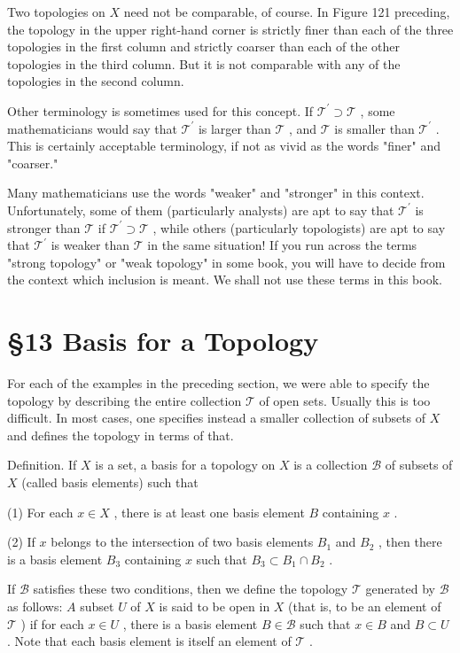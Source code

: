 Two topologies on \(X\) need not be comparable, of course. In Figure 121 preceding, the topology in the upper right-hand corner is strictly finer than each of the three topologies in the first column and strictly coarser than each of the other topologies in the third column. But it is not comparable with any of the topologies in the second column.

Other terminology is sometimes used for this concept. If \({\mathcal{T}}^{\prime } \supset  \mathcal{T}\) , some mathematicians would say that \({\mathcal{T}}^{\prime }\) is larger than \(\mathcal{T}\) , and \(\mathcal{T}\) is smaller than \({\mathcal{T}}^{\prime }\) . This is certainly acceptable terminology, if not as vivid as the words "finer" and "coarser."

Many mathematicians use the words "weaker" and "stronger" in this context. Unfortunately, some of them (particularly analysts) are apt to say that \({\mathcal{T}}^{\prime }\) is stronger than \(\mathcal{T}\) if \({\mathcal{T}}^{\prime } \supset  \mathcal{T}\) , while others (particularly topologists) are apt to say that \({\mathcal{T}}^{\prime }\) is weaker than \(\mathcal{T}\) in the same situation! If you run across the terms "strong topology" or "weak topology" in some book, you will have to decide from the context which inclusion is meant. We shall not use these terms in this book.

\section*{§13 Basis for a Topology}

For each of the examples in the preceding section, we were able to specify the topology by describing the entire collection \(\mathcal{T}\) of open sets. Usually this is too difficult. In most cases, one specifies instead a smaller collection of subsets of \(X\) and defines the topology in terms of that.

Definition. If \(X\) is a set, a basis for a topology on \(X\) is a collection \(\mathcal{B}\) of subsets of \(X\) (called basis elements) such that

(1) For each \(x \in  X\) , there is at least one basis element \(B\) containing \(x\) .

(2) If \(x\) belongs to the intersection of two basis elements \({B}_{1}\) and \({B}_{2}\) , then there is a basis element \({B}_{3}\) containing \(x\) such that \({B}_{3} \subset  {B}_{1} \cap  {B}_{2}\) .

If \(\mathcal{B}\) satisfies these two conditions, then we define the topology \(\mathcal{T}\) generated by \(\mathcal{B}\) as follows: \(A\) subset \(U\) of \(X\) is said to be open in \(X\) (that is, to be an element of \(\mathcal{T}\) ) if for each \(x \in  U\) , there is a basis element \(B \in  \mathcal{B}\) such that \(x \in  B\) and \(B \subset  U\) . Note that each basis element is itself an element of \(\mathcal{T}\) .

